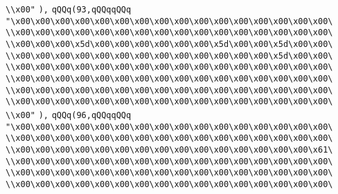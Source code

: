\verb|\\x00"|\newline
\verb|),|\newline
\verb|qQQq(93,qQQqqQQq|\newline
\verb|"\x00\x00\x00\x00\x00\x00\x00\x00\x00\x00\x00\x00\x00\x00\x00\x00\|\newline
\verb|\\x00\x00\x00\x00\x00\x00\x00\x00\x00\x00\x00\x00\x00\x00\x00\x00\|\newline
\verb|\\x00\x00\x00\x5d\x00\x00\x00\x00\x00\x00\x5d\x00\x00\x5d\x00\x00\|\newline
\verb|\\x00\x00\x00\x00\x00\x00\x00\x00\x00\x00\x00\x00\x00\x5d\x00\x00\|\newline
\verb|\\x00\x00\x00\x00\x00\x00\x00\x00\x00\x00\x00\x00\x00\x00\x00\x00\|\newline
\verb|\\x00\x00\x00\x00\x00\x00\x00\x00\x00\x00\x00\x00\x00\x00\x00\x00\|\newline
\verb|\\x00\x00\x00\x00\x00\x00\x00\x00\x00\x00\x00\x00\x00\x00\x00\x00\|\newline
\verb|\\x00\x00\x00\x00\x00\x00\x00\x00\x00\x00\x00\x00\x00\x00\x00\x00\|\newline
\verb|\\x00"|\newline
\verb|),|\newline
\verb|qQQq(96,qQQqqQQq|\newline
\verb|"\x00\x00\x00\x00\x00\x00\x00\x00\x00\x00\x00\x00\x00\x00\x00\x00\|\newline
\verb|\\x00\x00\x00\x00\x00\x00\x00\x00\x00\x00\x00\x00\x00\x00\x00\x00\|\newline
\verb|\\x00\x00\x00\x00\x00\x00\x00\x00\x00\x00\x00\x00\x00\x00\x00\x61\|\newline
\verb|\\x00\x00\x00\x00\x00\x00\x00\x00\x00\x00\x00\x00\x00\x00\x00\x00\|\newline
\verb|\\x00\x00\x00\x00\x00\x00\x00\x00\x00\x00\x00\x00\x00\x00\x00\x00\|\newline
\verb|\\x00\x00\x00\x00\x00\x00\x00\x00\x00\x00\x00\x00\x00\x00\x00\x00\|\newline
